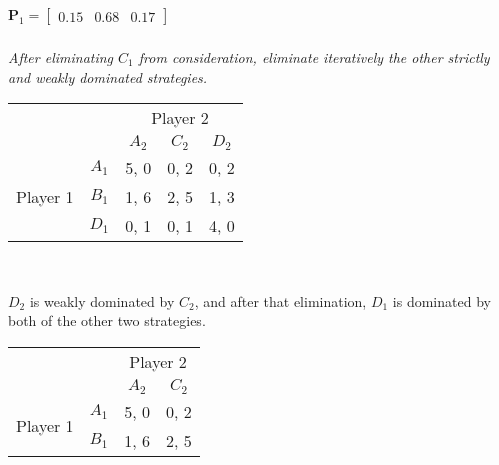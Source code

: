 \documentclass[12pt]{amsart}
\begin{document}
	\(\mathbf P_1 = \begin{bmatrix}0.15 & 0.68 & 0.17\end{bmatrix}\)

	\subsubsection{}
	\textit{After eliminating $C_1$ from consideration, eliminate iteratively the other strictly and
	weakly dominated strategies.} \\
	
	\begin{center}
		\def\arraystretch{1.25}%
		\begin{tabular}{ccccc}
			&                            & \multicolumn{3}{c}{Player 2}                                                         \\
			& \multicolumn{1}{c|}{}      & \multicolumn{1}{c|}{$A_2$} & \multicolumn{1}{c|}{$C_2$} & \multicolumn{1}{c|}{$D_2$} \\ \cline{2-5} 
			\multirow{3}{*}{Player 1} & \multicolumn{1}{c|}{$A_1$} & \multicolumn{1}{c|}{5, 0}  & \multicolumn{1}{c|}{0, 2}  & \multicolumn{1}{c|}{0, 2}  \\ \cline{2-5} 
			& \multicolumn{1}{c|}{$B_1$} & \multicolumn{1}{c|}{1, 6}  & \multicolumn{1}{c|}{2, 5}  & \multicolumn{1}{c|}{1, 3}  \\ \cline{2-5} 
			& \multicolumn{1}{c|}{$D_1$} & \multicolumn{1}{c|}{0, 1}  & \multicolumn{1}{c|}{0, 1}  & \multicolumn{1}{c|}{4, 0}  \\ \cline{2-5} 
		\end{tabular}\\[2ex]
	\end{center}
	
	$D_2$ is weakly dominated by $C_2$, and after that elimination, 
	$D_1$ is dominated by both of the other two strategies.
	
	\begin{center}
		\def\arraystretch{1.25}%
		\begin{tabular}{cccc}
			&                            & \multicolumn{2}{c}{Player 2}                            \\
			& \multicolumn{1}{c|}{}      & \multicolumn{1}{c|}{$A_2$} & \multicolumn{1}{c|}{$C_2$} \\ \cline{2-4} 
			\multirow{2}{*}{Player 1} & \multicolumn{1}{c|}{$A_1$} & \multicolumn{1}{c|}{5, 0}  & \multicolumn{1}{c|}{0, 2}  \\ \cline{2-4} 
			& \multicolumn{1}{c|}{$B_1$} & \multicolumn{1}{c|}{1, 6}  & \multicolumn{1}{c|}{2, 5} 
		\end{tabular}
	\end{center}
	
\end{document}
